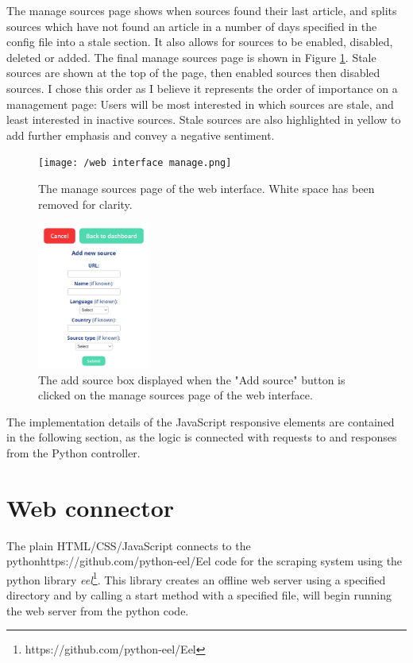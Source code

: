 \documentclass{l4proj}
\begin{document}
The manage sources page shows when sources found their last article, and splits sources which have not found an article in a number of days specified in the config file into a stale section. It also allows for sources to be enabled, disabled, deleted or added. The final manage sources page is shown in Figure \ref{fig:web-interface-manage}. Stale sources are shown at the top of the page, then enabled sources then disabled sources. I chose this order as I believe it represents the order of importance on a management page: Users will be most interested in which sources are stale, and least interested in inactive sources. Stale sources are also highlighted in yellow to add further emphasis and convey a negative sentiment. 

\begin{figure}[!ht]
\centering
\texttt{[image: /web interface manage.png]}
\caption{The manage sources page of the web interface. White space has been removed for clarity.}
\label{fig:web-interface-manage}
\end{figure}

\begin{figure}[!ht]
\centering
\includegraphics[width=0.33\textwidth]{images/add-source-box.png}
\caption{The add source box displayed when the "Add source" button is clicked on the manage sources page of the web interface.}
\label{fig:add-sources-box}
\end{figure}

The implementation details of the JavaScript responsive elements are contained in the following section, as the logic is connected with requests to and responses from the Python controller.

\section{Web connector}
The plain HTML/CSS/JavaScript connects to the pythonhttps://github.com/python-eel/Eel code for the scraping system using the python library \emph{eel}\footnote{https://github.com/python-eel/Eel}. This library creates an offline web server using a specified directory and by calling a start method with a specified file, will begin running the web server from the python code.
\end{document}
